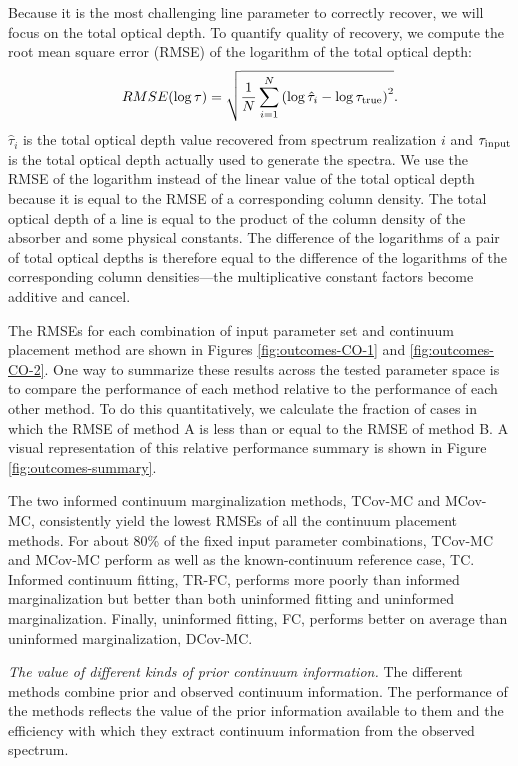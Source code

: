 \documentclass[trackchanges]{aastex62}
\begin{document}
{Because it is the most challenging line parameter to correctly recover, we will focus on the total optical depth.
To quantify quality of recovery, we compute the root mean square error (RMSE) of the logarithm of the total optical depth:
\begin{equation}
  \label{eqn:RMSE-def}
  RMSE(\log\tau) = \sqrt{
    \frac{1}{N} \sum_{i=1}^{N} \left( \log\hat{\tau}_i - \log\tau_{\rm true} \right)^2
  }.
\end{equation}
$\hat{\tau}_i$ is the total optical depth value recovered from spectrum realization $i$ and $\tau_{\rm input}$ is the total optical depth actually used to generate the spectra.
We use the RMSE of the logarithm instead of the linear value of the total optical depth because it is equal to the RMSE of a corresponding column density.
The total optical depth of a line is equal to the product of the column density of the absorber and some physical constants.
The difference of the logarithms of a pair of total optical depths is therefore equal to the difference of the logarithms of the corresponding column densities---the multiplicative constant factors become additive and cancel.

The RMSEs for each combination of input parameter set and continuum placement method are shown in Figures \ref{fig:outcomes-CO-1} and \ref{fig:outcomes-CO-2}.
One way to summarize these results across the tested parameter space is to compare the performance of each method relative to the performance of each other method.
To do this quantitatively, we calculate the fraction of cases in which the RMSE of method A is less than or equal to the RMSE of method B.
A visual representation of this relative performance summary is shown in Figure \ref{fig:outcomes-summary}.

The two informed continuum marginalization methods, TCov-MC and MCov-MC, consistently yield the lowest RMSEs of all the continuum placement methods.
For about 80\% of the fixed input parameter combinations, TCov-MC and MCov-MC perform as well as the known-continuum reference case, TC.
Informed continuum fitting, TR-FC, performs more poorly than informed marginalization but better than both uninformed fitting and uninformed marginalization.
Finally, uninformed fitting, FC, performs better on average than uninformed marginalization, DCov-MC.

\emph{The value of different kinds of prior continuum information.}
The different methods combine prior and observed continuum information.
The performance of the methods reflects the value of the prior information available to them and the efficiency with which they extract continuum information from the observed spectrum.

}
\end{document}
